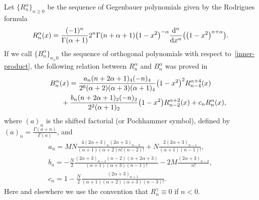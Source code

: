 \documentclass[11pt]{article}
\numberwithin{equation}{section}
\begin{document}
Let $\{R_n^{\alpha}\}_{n\ge 0}$ be the sequence of Gegenbauer polynomials given by the Rodrigues formula
\begin{gather*}
R_n^{\alpha}(x)=\frac{(-1)^n}{\Gamma(\alpha+1)}{2^n\Gamma(n+\alpha+1)}\big(1-x^2\big)^{-\alpha} \frac{{\rm d}^n}{{\rm d}x^n}\big(\big(1-x^2\big)^{n+\alpha}\big).
\end{gather*}
If we call $\{B_n^{\alpha}\}_{n_\ge 0}$ the sequence of orthogonal polynomials with respect to~\eqref{inner-product}, the following relation between $R_n^{\alpha}$ and $B_n^{\alpha}$ was proved in \cite{bavinck}
\begin{gather}
B_n^{\alpha}(x)=\frac{a_n(n+2\alpha+1)_4(-n)_4}{2^6(\alpha+2)(\alpha+3)(\alpha+1)_4}\big(1-x^2\big)^2R_{n-4}^{\alpha+4}(x)\nonumber\\
\hphantom{B_n^{\alpha}(x)=}{} +\frac{b_n(n+2\alpha+1)_2(-n)_2}{2^2(\alpha+1)_2}\big(1-x^2\big)R_{n-2}^{\alpha+2}(x)+c_nR_n^{\alpha}(x),\label{rel-ortogonal}
\end{gather}
where $(a)_n$ is the shifted factorial (or Pochhammer symbol), defined by $(a)_n=\frac{\Gamma(a+n)}{\Gamma(a)}$, and
\begin{gather*}
a_n=MN\frac{4(2\alpha+3)_n(2\alpha+3)_{n-2}}{(\alpha+1)(\alpha+2)n!(n-2)!}+N\frac{2(2\alpha+3)_{n-1}}{(\alpha+1)(n-1)!},\\
b_n =-\frac{N}{2}\frac{(2\alpha+3)_{n-1}(n-2)(n+2\alpha+3)}{(\alpha+1)(\alpha+3)(n-1)!}-2M\frac{(2\alpha+3)_{n-2}}{n!},\\
c_n=1-\frac{N}{2}\frac{(2\alpha+3)_{n+1}}{(\alpha+1)(\alpha+2)(\alpha+3)(n-3)!}.
\end{gather*}
Here and elsewhere we use the convention that $R_n^{\gamma}\equiv 0$ if $n<0$.
\end{document}
